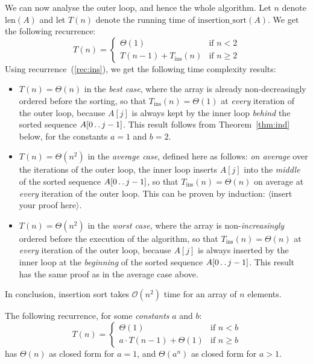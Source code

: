 \documentclass[a4paper,11pt]{article}
\newcommand{\length}[1]{\text{len}(#1)}
\newcommand{\twodots}{\mathinner{\ldotp\ldotp}}  %
\newcommand{\Oh}[1]{\mathcal{O}\left(#1\right)}
\begin{document}
We can now analyse the outer loop, and hence the whole algorithm.  Let
$n$ denote $\length{A}$ and let $T(n)$ denote the running time of
$\text{insertion\_sort}(A)$.  We get the following recurrence:
\begin{equation*}
  T(n) =
  \begin{cases}
    \Theta(1) & \text{if~} n < 2 \\
    T(n-1) + T_{\text{ins}}(n) & \text{if~} n \geq 2
  \end{cases}
\end{equation*}
Using recurrence~(\ref{rec:ins}), we get the following time complexity
results:
\begin{itemize}
\item $T(n) = \Theta(n)$ in the \emph{best case}, where the array is
  already non-decreasingly ordered before the sorting, so that
  $T_{\text{ins}}(n) = \Theta(1)$ at \emph{every} iteration of the
  outer loop, because $A[j]$ is always kept by the inner loop
  \emph{behind} the sorted sequence $A[0 \twodots j-1]$.  This result
  follows from Theorem~\ref{thm:ind} below, for the constants $a=1$
  and $b=2$.
\item $T(n) = \Theta(n^2)$ in the \emph{average case}, defined here as
  follows: \emph{on average} over the iterations of the outer loop,
  the inner loop inserts $A[j]$ into the \emph{middle} of the sorted
  sequence $A[0 \twodots j-1]$, so that $T_{\text{ins}}(n) =
  \Theta(n)$ on average at \emph{every} iteration of the outer loop.
  This can be proven by induction: $\langle$insert your proof
  here$\rangle$.
\item $T(n) = \Theta(n^2)$ in the \emph{worst case}, where the array
  is non-\emph{increasingly} ordered before the execution of the
  algorithm, so that $T_{\text{ins}}(n) = \Theta(n)$ at \emph{every}
  iteration of the outer loop, because $A[j]$ is always inserted by
  the inner loop at the \emph{beginning} of the sorted sequence $A[0
  \twodots j-1]$.  This result has the same proof as in the average
  case above.
\end{itemize}
In conclusion, insertion sort takes $\Oh{n^2}$ time for an array of
$n$ elements.

\begin{theorem}
  \label{thm:ind}
  The following recurrence, for some \emph{constants} $a$ and $b$:
  \[
  T(n) =
  \begin{cases}
    \Theta(1) & \text{if~} n < b \\
    a \cdot T(n-1) + \Theta(1) & \text{if~} n \geq b
  \end{cases}
  \]
  has $\Theta(n)$ as closed form for $a = 1$, and $\Theta(a^n)$ as
  closed form for $a > 1$.
\end{theorem}
\end{document}
